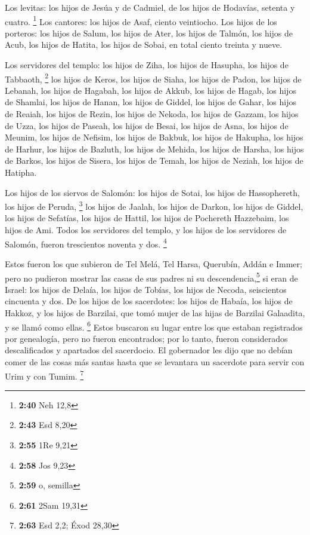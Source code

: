 \begin{paracol}{2}
 Los levitas: los hijos de Jesúa y de Cadmiel, de los
hijos de Hodavías, setenta y cuatro. \footnote{\textbf{2:40} Neh 12,8}
 Los cantores: los hijos de Asaf, ciento veintiocho.
 Los hijos de los porteros: los hijos de Salum, los hijos
de Ater, los hijos de Talmón, los hijos de Acub, los hijos de Hatita,
los hijos de Sobai, en total ciento treinta y nueve.

 Los servidores del templo: los hijos de Ziha, los hijos
de Hasupha, los hijos de Tabbaoth, \footnote{\textbf{2:43} Esd 8,20}
 los hijos de Keros, los hijos de Siaha, los hijos de
Padon,  los hijos de Lebanah, los hijos de Hagabah, los
hijos de Akkub,  los hijos de Hagab, los hijos de
Shamlai, los hijos de Hanan,  los hijos de Giddel, los
hijos de Gahar, los hijos de Reaiah,  los hijos de Rezin,
los hijos de Nekoda, los hijos de Gazzam,  los hijos de
Uzza, los hijos de Paseah, los hijos de Besai,  los hijos
de Asna, los hijos de Meunim, los hijos de Nefisim,  los
hijos de Bakbuk, los hijos de Hakupha, los hijos de Harhur,
 los hijos de Bazluth, los hijos de Mehida, los hijos de
Harsha,  los hijos de Barkos, los hijos de Sisera, los
hijos de Temah,  los hijos de Neziah, los hijos de
Hatipha.

 Los hijos de los siervos de Salomón: los hijos de Sotai,
los hijos de Hassophereth, los hijos de Peruda, \footnote{\textbf{2:55}
  1Re 9,21}  los hijos de Jaalah, los hijos de Darkon,
los hijos de Giddel,  los hijos de Sefatías, los hijos de
Hattil, los hijos de Pochereth Hazzebaim, los hijos de Ami.
 Todos los servidores del templo, y los hijos de los
servidores de Salomón, fueron trescientos noventa y dos. \footnote{\textbf{2:58}
  Jos 9,23}

 Estos fueron los que subieron de Tel Melá, Tel Harsa,
Querubín, Addán e Immer; pero no pudieron mostrar las casas de sus
padres ni su descendencia,\footnote{\textbf{2:59} o, semilla} si eran de
Israel:  los hijos de Delaía, los hijos de Tobías, los
hijos de Necoda, seiscientos cincuenta y dos.  De los
hijos de los sacerdotes: los hijos de Habaía, los hijos de Hakkoz, y los
hijos de Barzilai, que tomó mujer de las hijas de Barzilai Galaadita, y
se llamó como ellas. \footnote{\textbf{2:61} 2Sam 19,31} 
Estos buscaron su lugar entre los que estaban registrados por
genealogía, pero no fueron encontrados; por lo tanto, fueron
considerados descalificados y apartados del sacerdocio. 
El gobernador les dijo que no debían comer de las cosas más santas hasta
que se levantara un sacerdote para servir con Urim y con Tumim.
\footnote{\textbf{2:63} Esd 2,2; Éxod 28,30}


\end{paracol}
